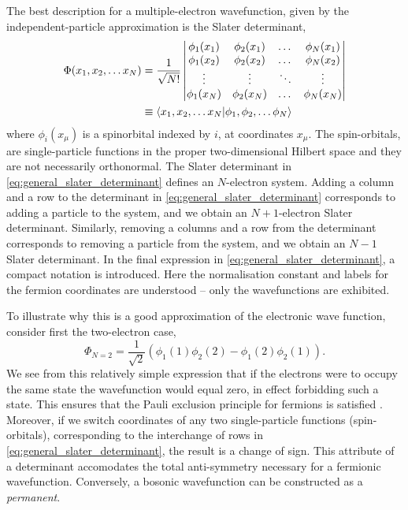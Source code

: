 The best description for a multiple-electron wavefunction, given by the independent-particle
approximation is the Slater determinant,
\begin{equation}
    \label{eq:general_slater_determinant}
    \begin{aligned}
    \Phi(x_1, x_2, \dots x_N) &= \frac{1}{\sqrt{N!}} \begin{vmatrix}
        \phi_1(x_1) & \phi_2(x_1) & \dots & \phi_N(x_1) \\
        \phi_1(x_2) & \phi_2(x_2) & \dots & \phi_N(x_2) \\
        \vdots & \vdots & \ddots & \vdots \\
        \phi_1(x_N) & \phi_2(x_N) & \dots & \phi_N(x_N)
    \end{vmatrix} \\
    &\equiv 
    \braket{x_1,x_2,\dots x_N}{\phi_1,\phi_2,\dots \phi_N}
    \end{aligned}
\end{equation}
where $\phi_i(x_\mu)$ is a spinorbital indexed by $i$, at coordinates
$x_\mu$. The
spin-orbitals, are single-particle functions in the proper two-dimensional 
Hilbert space and they are not necessarily orthonormal.
The Slater determinant in \autoref{eq:general_slater_determinant}
defines an $N$-electron system. Adding a column and a row to the
determinant in \autoref{eq:general_slater_determinant} corresponds to 
adding a particle to the system, and we obtain an $N+1$-electron Slater determinant.
Similarly, removing a columns and a row 
from the determinant corresponds to removing a particle from the system, and we 
obtain an $N-1$ Slater determinant.
In the final expression in \autoref{eq:general_slater_determinant},
a compact notation is introduced. Here the normalisation constant and labels
for the fermion coordinates are understood – only the wavefunctions are exhibited.

To illustrate why this is a good approximation of the electronic wave function,
consider first the two-electron case,
\begin{equation}
    \Phi_{N=2} = \frac{1}{\sqrt{2}}(\phi_1(1)\phi_2(2) - \phi_1(2)\phi_2(1)).
\end{equation}
We see from this relatively simple expression that if the electrons were to occupy
the same state the wavefunction would equal zero, in effect forbidding such a state.
This ensures that the Pauli exclusion principle for 
fermions is satisfied \cite{pauli1925zusammenhang}. Moreover, if we switch coordinates of any two 
single-particle functions (spin-orbitals), corresponding to the interchange of rows in
\autoref{eq:general_slater_determinant}, the result is a change of sign. This attribute
of a determinant accomodates the total anti-symmetry necessary for a fermionic wavefunction.
Conversely, a bosonic wavefunction can be constructed as a \emph{permanent}.

